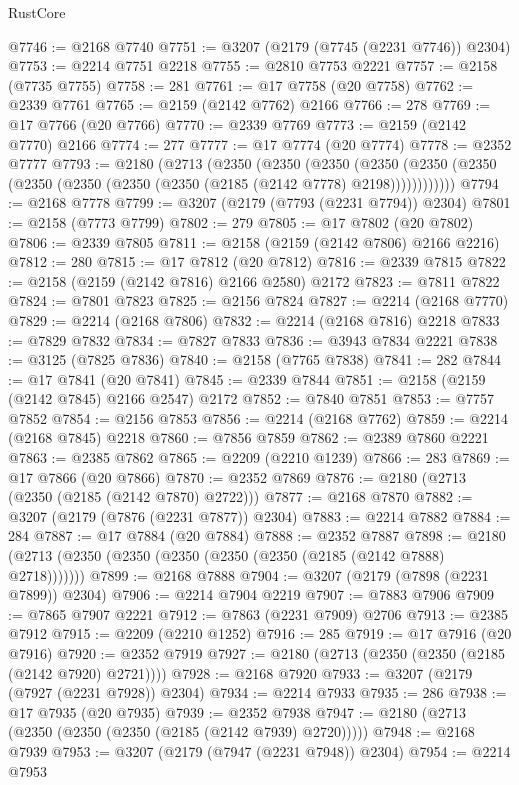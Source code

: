 \begin{lexlean}{RustCore}
\begin{coremodule}
@7746 := @2168 @7740
@7751 := @3207 (@2179 (@7745 (@2231 @7746)) @2304)
@7753 := @2214 @7751 @2218
@7755 := @2810 @7753 @2221
@7757 := @2158 (@7735 @7755)
@7758 := 281
@7761 := @17 @7758 (@20 @7758)
@7762 := @2339 @7761
@7765 := @2159 (@2142 @7762) @2166
@7766 := 278
@7769 := @17 @7766 (@20 @7766)
@7770 := @2339 @7769
@7773 := @2159 (@2142 @7770) @2166
@7774 := 277
@7777 := @17 @7774 (@20 @7774)
@7778 := @2352 @7777
@7793 := @2180
    (@2713
      (@2350
        (@2350
          (@2350
            (@2350 (@2350 (@2350 (@2350 (@2350 (@2350 (@2350 (@2185 (@2142 @7778) @2198))))))))))))
@7794 := @2168 @7778
@7799 := @3207 (@2179 (@7793 (@2231 @7794)) @2304)
@7801 := @2158 (@7773 @7799)
@7802 := 279
@7805 := @17 @7802 (@20 @7802)
@7806 := @2339 @7805
@7811 := @2158 (@2159 (@2142 @7806) @2166 @2216)
@7812 := 280
@7815 := @17 @7812 (@20 @7812)
@7816 := @2339 @7815
@7822 := @2158 (@2159 (@2142 @7816) @2166 @2580) @2172
@7823 := @7811 @7822
@7824 := @7801 @7823
@7825 := @2156 @7824
@7827 := @2214 (@2168 @7770)
@7829 := @2214 (@2168 @7806)
@7832 := @2214 (@2168 @7816) @2218
@7833 := @7829 @7832
@7834 := @7827 @7833
@7836 := @3943 @7834 @2221
@7838 := @3125 (@7825 @7836)
@7840 := @2158 (@7765 @7838)
@7841 := 282
@7844 := @17 @7841 (@20 @7841)
@7845 := @2339 @7844
@7851 := @2158 (@2159 (@2142 @7845) @2166 @2547) @2172
@7852 := @7840 @7851
@7853 := @7757 @7852
@7854 := @2156 @7853
@7856 := @2214 (@2168 @7762)
@7859 := @2214 (@2168 @7845) @2218
@7860 := @7856 @7859
@7862 := @2389 @7860 @2221
@7863 := @2385 @7862
@7865 := @2209 (@2210 @1239)
@7866 := 283
@7869 := @17 @7866 (@20 @7866)
@7870 := @2352 @7869
@7876 := @2180 (@2713 (@2350 (@2185 (@2142 @7870) @2722)))
@7877 := @2168 @7870
@7882 := @3207 (@2179 (@7876 (@2231 @7877)) @2304)
@7883 := @2214 @7882
@7884 := 284
@7887 := @17 @7884 (@20 @7884)
@7888 := @2352 @7887
@7898 := @2180 (@2713 (@2350 (@2350 (@2350 (@2350 (@2350 (@2185 (@2142 @7888) @2718)))))))
@7899 := @2168 @7888
@7904 := @3207 (@2179 (@7898 (@2231 @7899)) @2304)
@7906 := @2214 @7904 @2219
@7907 := @7883 @7906
@7909 := @7865 @7907 @2221
@7912 := @7863 (@2231 @7909) @2706
@7913 := @2385 @7912
@7915 := @2209 (@2210 @1252)
@7916 := 285
@7919 := @17 @7916 (@20 @7916)
@7920 := @2352 @7919
@7927 := @2180 (@2713 (@2350 (@2350 (@2185 (@2142 @7920) @2721))))
@7928 := @2168 @7920
@7933 := @3207 (@2179 (@7927 (@2231 @7928)) @2304)
@7934 := @2214 @7933
@7935 := 286
@7938 := @17 @7935 (@20 @7935)
@7939 := @2352 @7938
@7947 := @2180 (@2713 (@2350 (@2350 (@2350 (@2185 (@2142 @7939) @2720)))))
@7948 := @2168 @7939
@7953 := @3207 (@2179 (@7947 (@2231 @7948)) @2304)
@7954 := @2214 @7953

\end{coremodule}
\end{lexlean}
